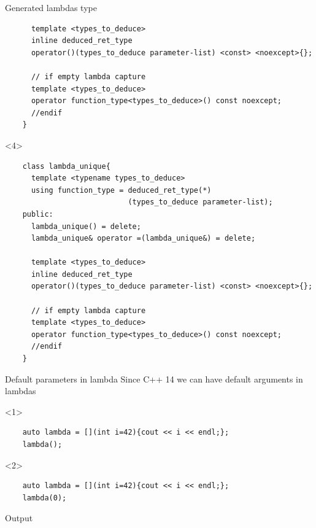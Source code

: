 \documentclass[10pt]{beamer}
\begin{document}
\begin{frame}[fragile]{Generated lambdas type}
\begin{onlyenv}
\begin{verbatim}
	  template <types_to_deduce>
	  inline deduced_ret_type 
	  operator()(types_to_deduce parameter-list) <const> <noexcept>{};
		
	  // if empty lambda capture
	  template <types_to_deduce>
	  operator function_type<types_to_deduce>() const noexcept;
	  //endif
	}
	\end{verbatim}
	\end{onlyenv}
	\begin{onlyenv}
	\begin{verbatim}
	class lambda_unique{
	  template <typename types_to_deduce>
	  using function_type = deduced_ret_type(*)
	                        (types_to_deduce parameter-list); 
	public:
	  lambda_unique() = delete;
	  lambda_unique& operator =(lambda_unique&) = delete;

	  template <types_to_deduce>
	  inline deduced_ret_type 
	  operator()(types_to_deduce parameter-list) <const> <noexcept>{};
		
	  // if empty lambda capture
	  template <types_to_deduce>
	  operator function_type<types_to_deduce>() const noexcept;
	  //endif
	}
	\end{verbatim}
	\end{onlyenv}

\end{frame}

\begin{frame}[fragile]{Default parameters in lambda}
	\centering Since C++ 14 we can have default arguments in lambdas

	\begin{onlyenv}
	\begin{verbatim}
	auto lambda = [](int i=42){cout << i << endl;};
	lambda();
	\end{verbatim}
	\end{onlyenv}

	\begin{onlyenv}
	\begin{verbatim}
	auto lambda = [](int i=42){cout << i << endl;};
	lambda(0);
	\end{verbatim}
	\end{onlyenv}

	\vfill

	\begin{block}{Output}
	\only<1>{42}
	\only<2>{0}
	\end{block}

\end{frame}
\end{document}
